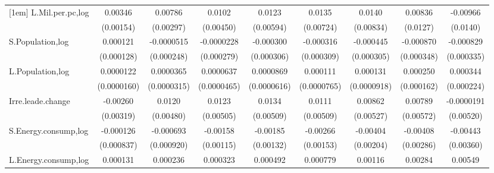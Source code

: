 \begin{table}[htbp]
\begin{tabular}{l*{8}{c}}
[1em]
L.Mil.per.pc,log    &     0.00346\sym{**} &     0.00786\sym{***}&      0.0102\sym{**} &      0.0123\sym{**} &      0.0135\sym{*}  &      0.0140\sym{*}  &     0.00836         &    -0.00966         \\
                    &   (0.00154)         &   (0.00297)         &   (0.00450)         &   (0.00594)         &   (0.00724)         &   (0.00834)         &    (0.0127)         &    (0.0140)         \\
[1em]
S.Population,log    &    0.000121         &  -0.0000515         &  -0.0000228         &   -0.000300         &   -0.000316         &   -0.000445         &   -0.000870\sym{**} &   -0.000829\sym{**} \\
                    &  (0.000128)         &  (0.000248)         &  (0.000279)         &  (0.000306)         &  (0.000309)         &  (0.000305)         &  (0.000348)         &  (0.000335)         \\
[1em]
L.Population,log    &   0.0000122         &   0.0000365         &   0.0000637         &   0.0000869         &    0.000111         &    0.000131         &    0.000250         &    0.000344         \\
                    & (0.0000160)         & (0.0000315)         & (0.0000465)         & (0.0000616)         & (0.0000765)         & (0.0000918)         &  (0.000162)         &  (0.000224)         \\
[1em]
Irre.leade.change   &    -0.00260         &      0.0120\sym{**} &      0.0123\sym{**} &      0.0134\sym{***}&      0.0111\sym{**} &     0.00862         &     0.00789         &  -0.0000191         \\
                    &   (0.00319)         &   (0.00480)         &   (0.00505)         &   (0.00509)         &   (0.00509)         &   (0.00527)         &   (0.00572)         &   (0.00520)         \\
[1em]
S.Energy.consump,log&   -0.000126         &   -0.000693         &    -0.00158         &    -0.00185         &    -0.00266\sym{*}  &    -0.00404\sym{**} &    -0.00408         &    -0.00443         \\
                    &  (0.000837)         &  (0.000920)         &   (0.00115)         &   (0.00132)         &   (0.00153)         &   (0.00204)         &   (0.00286)         &   (0.00360)         \\
[1em]
L.Energy.consump,log&    0.000131         &    0.000236         &    0.000323         &    0.000492         &    0.000779         &     0.00116         &     0.00284         &     0.00549\sym{*}  \\

\end{tabular}
\end{table}
